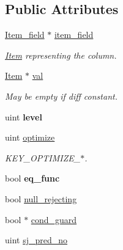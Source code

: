 \subsection*{Public Attributes}
\begin{DoxyCompactItemize}
\item 
\mbox{\label{structKey__field_a39e101c4060217fef72441bd79965d72}} 
\mbox{\hyperlink{classItem__field}{Item\+\_\+field}} $\ast$ \mbox{\hyperlink{structKey__field_a39e101c4060217fef72441bd79965d72}{item\+\_\+field}}
\begin{DoxyCompactList}\small\item\em \mbox{\hyperlink{classItem}{Item}} representing the column. \end{DoxyCompactList}\item 
\mbox{\label{structKey__field_ab487719698cf68eea0283f1b0eac01e7}} 
\mbox{\hyperlink{classItem}{Item}} $\ast$ \mbox{\hyperlink{structKey__field_ab487719698cf68eea0283f1b0eac01e7}{val}}
\begin{DoxyCompactList}\small\item\em May be empty if diff constant. \end{DoxyCompactList}\item 
\mbox{\label{structKey__field_ab5afc4f48a538d6ce9337fe2a2d9aa78}} 
uint {\bfseries level}
\item 
\mbox{\label{structKey__field_a8020afcf7b7a870d86586052442e347f}} 
uint \mbox{\hyperlink{structKey__field_a8020afcf7b7a870d86586052442e347f}{optimize}}
\begin{DoxyCompactList}\small\item\em K\+E\+Y\+\_\+\+O\+P\+T\+I\+M\+I\+Z\+E\+\_\+$\ast$. \end{DoxyCompactList}\item 
\mbox{\label{structKey__field_ac0bd9ff1c9287d8cd8970eb4f71af9fa}} 
bool {\bfseries eq\+\_\+func}
\item 
bool \mbox{\hyperlink{structKey__field_ad15eb695b878f6436d97bcc8f37fad20}{null\+\_\+rejecting}}
\item 
bool $\ast$ \mbox{\hyperlink{structKey__field_a16b72e1543518a93bca63b15f6274598}{cond\+\_\+guard}}
\item 
uint \mbox{\hyperlink{structKey__field_a3875eb5a8e4115e34a319bd770b251c8}{sj\+\_\+pred\+\_\+no}}
\end{DoxyCompactItemize}


